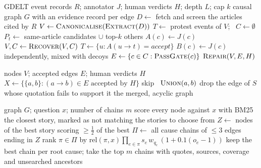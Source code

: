 \documentclass[conference]{IEEEtran}
\begin{document}
\begin{algorithm}[t]
\caption{Build: from GDELT to a causal graph}
\label{alg:build}
\small
\begin{algorithmic}[1]
\Require GDELT event records $R$; annotator $J$; human verdicts $H$; depth $L$; cap $k$
\Ensure causal graph $G$ with an evidence record per edge
\State $D \gets$ fetch and screen the articles cited by $R$
\State $V \gets \textsc{Canonicalise}(\textsc{Extract}(D))$ 
\State $T \gets$ protest events of $V$; \ $C \gets \emptyset$
    \State $P_t \gets$ same-article candidates $\cup$ top-$k$ others
      \State $A(c) \gets J(c)$ 
    \EndFor
  \EndFor
  \State $V, C \gets \textsc{Recover}(V, C)$ 
  \State $T \gets \{u : A(u\rightarrow t)=\textit{accept}\}$ 
\EndFor
{}
  \State $B(c) \gets J(c)$ independently, mixed with decoys
\EndFor
\State $E \gets \{c \in C : \textsc{PassGate}(c)\}$ 
\State \Return $\textsc{Repair}(V, E, H)$
\end{algorithmic}
\end{algorithm}

\begin{algorithm}[t]
\caption{\textsc{Repair}: constrained merges and cycle removal}
\label{alg:repair}
\small
\begin{algorithmic}[1]
\Require nodes $V$; accepted edges $E$; human verdicts $H$
\State $X \gets \{\{a,b\} : (a\rightarrow b) \in E \text{ accepted by } H\}$ 
   skip
  \Else \ $\textsc{Union}(a,b)$
  \EndIf
\EndFor
{}
  \State drop the edge of $S$ whose quotation fails to support it
\EndWhile
\State \Return the merged, acyclic graph
\end{algorithmic}
\end{algorithm}

\begin{algorithm}[t]
\caption{Query: why did $x$ happen?}
\label{alg:query}
\small
\begin{algorithmic}[1]
\Require graph $G$; question $x$; number of chains $m$
\State score every node against $x$ with BM25 
 \Return the closest story, marked as not matching
\EndIf
{} \Return the stories to choose from
\EndIf
\State $Z \gets$ nodes of the best story scoring $\ge \frac{1}{2}$ of the best
\State $\Pi \gets$ all cause chains of $\le 3$ edges ending in $Z$
\State rank $\pi\in\Pi$ by $\mathrm{rel}(\pi,x)\prod_{e\in\pi} s_e\, w_{q_e}\,(1+0.1(o_e-1))$
\State keep the best chain per root cause; take the top $m$
\State \Return chains with quotes, sources, coverage and unsearched ancestors
\end{algorithmic}
\end{algorithm}
\end{document}
